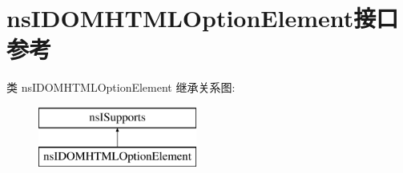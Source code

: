 \hypertarget{interfacens_i_d_o_m_h_t_m_l_option_element}{}\section{ns\+I\+D\+O\+M\+H\+T\+M\+L\+Option\+Element接口 参考}
\label{interfacens_i_d_o_m_h_t_m_l_option_element}
类 ns\+I\+D\+O\+M\+H\+T\+M\+L\+Option\+Element 继承关系图\+:\begin{figure}[H]
\begin{center}
\leavevmode
\includegraphics[height=2.000000cm]{interfacens_i_d_o_m_h_t_m_l_option_element}
\end{center}
\end{figure}
